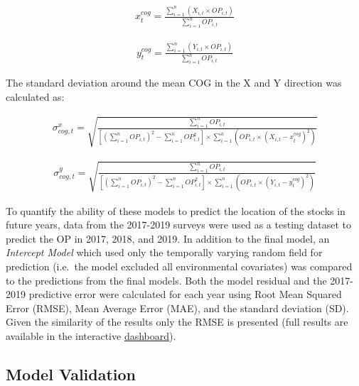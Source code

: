 \documentclass[
]{article}
\begin{document}
\begin{align} 
x_{t}^{cog} = \frac{\sum_{i=1}^{n} (X_{i,t} \times OP_{i,t})}{\sum_{i=1}^{n}OP_{i,t}} 
\end{align}

\begin{align}
y_{t}^{cog} = \frac{\sum_{i=1}^{n} (Y_{i,t} \times OP_{i,t})}{\sum_{i=1}^{n}OP_{i,t}}
\end{align}

The standard deviation around the mean COG in the X and Y direction was calculated as:

\begin{align}
\sigma_{cog,t}^{x} = \sqrt{\frac{ \sum_{i=1}^{n}OP_{i,t}} { [(\sum_{i=1}^{n}OP_{i,t})^2 - \sum_{i=1}^{n}OP_{i,t}^2] \times \sum_{i=1}^{n} (OP_{i,t}  \times (X_{i,t} - x_{t}^{cog})^2)}} 
\end{align}

\begin{align}
\sigma_{cog,t}^{y} = \sqrt {\frac{ \sum_{i=1}^{n}OP_{i,t}} { [(\sum_{i=1}^{n}OP_{i,t})^2 - \sum_{i=1}^{n}OP_{i,t}^2] \times \sum_{i=1}^{n} (OP_{i,t}  \times (Y_{i,t} - y_{t}^{cog})^2)}} 
\end{align}

To quantify the ability of these models to predict the location of the stocks in future years, data from the 2017-2019 surveys were used as a testing dataset to predict the OP in 2017, 2018, and 2019. In addition to the final model, an \emph{Intercept Model} which used only the temporally varying random field for prediction (i.e.~the model excluded all environmental covariates) was compared to the predictions from the final models. Both the model residual and the 2017-2019 predictive error were calculated for each year using Root Mean Squared Error (RMSE), Mean Average Error (MAE), and the standard deviation (SD). Given the similarity of the results only the RMSE is presented (full results are available in the interactive \href{https://github.com/Dave-Keith/Paper_2_SDMs/tree/master/Dashboard}{dashboard}).

\hypertarget{model-validation}{%
\subsection{Model Validation}\label{model-validation}}
\end{document}
